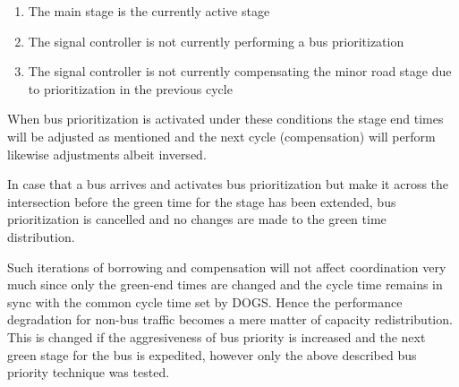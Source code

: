 \begin{enumerate}
\item The main stage is the currently active stage
\item The signal controller is not currently performing a bus prioritization
\item The signal controller is not currently compensating the minor road stage due to prioritization in the previous cycle
\end{enumerate}

When bus prioritization is activated under these conditions the stage end times will be adjusted as mentioned and the next cycle (compensation) will perform likewise adjustments albeit inversed.

In case that a bus arrives and activates bus prioritization but make it across the intersection before the green time for the stage has been extended, bus prioritization is cancelled and no changes are made to the green time distribution.

Such iterations of borrowing and compensation will not affect coordination very much since only the green-end times are changed and the cycle time remains in sync with the common cycle time set by DOGS. Hence the performance degradation for non-bus traffic becomes a mere matter of capacity redistribution. This is changed if the aggresiveness of bus priority is increased and the next green stage for the bus is expedited, however only the above described bus priority technique was tested.